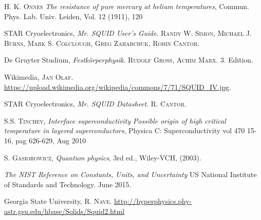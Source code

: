 \documentclass[a4paper,10pt]{article}
\begin{document}
\begin{thebibliography}{99}
 \textsc{H. K. Onnes} \textit{The resistance of pure mercury at helium temperatures}, Commun. Phys. Lab. Univ. Leiden, Vol. 12 (1911), 120 

STAR Cryoelectronics, \textit{Mr. SQUID User's  Guide}. \textsc{Randy W. Simon, Michael J. Burns, Mark S. Colclough, Greg Zaharchuk, Robin Cantor}. 

De Gruyter Studium, \textit{Festkörperphysik}. \textsc{Rudolf Gross, Achim Marx}. 3. Edition.

Wikimedia, \textsc{Jan Olaf}. \url{https://upload.wikimedia.org/wikipedia/commons/7/71/SQUID_IV.jpg}.

STAR Cryoelectronics, \textit{Mr. SQUID Datasheet}. \textsc{R. Cantor}. 

  \textsc{S.S. Tinchev}, \textit{Interface superconductivity {\textendash} Possible origin of high critical temperature in layered superconductors}, Physica C: Superconductivity vol 470 15-16, pag 626-629, Aug 2010

\textsc{S. Gasiorowicz}, \textit{Quantum physics}, 3rd ed., Wiley-VCH, (2003).

\textit{The NIST Reference on Constants, Units, and Uncertainty} US National Institute of Standards and Technology. June 2015. 

Georgia State University, \textsc{R. Nave}. \url{http://hyperphysics.phy-astr.gsu.edu/hbase/Solids/Squid2.html}

\end{thebibliography}
\end{document}
